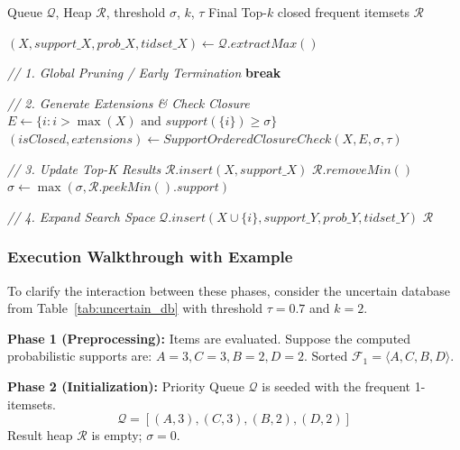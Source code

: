 \documentclass[10pt,letterpaper]{article}
\begin{document}
\begin{algorithm}[H]
\caption{Phase 3: Best-First Mining}
\label{alg:phase3}
\begin{algorithmic}[1]
\footnotesize
\REQUIRE Queue $\mathcal{Q}$, Heap $\mathcal{R}$, threshold $\sigma$, $k$, $\tau$
\ENSURE Final Top-$k$ closed frequent itemsets $\mathcal{R}$

    \STATE $(X, support\_X, prob\_X, tidset\_X) \leftarrow \mathcal{Q}.extractMax()$
    
    \STATE \textit{// 1. Global Pruning / Early Termination}
        \STATE \textbf{break} 
    \ENDIF
    
    \STATE \textit{// 2. Generate Extensions \& Check Closure}
    \STATE $E \leftarrow \{i : i > \max(X) \text{ and } support(\{i\}) \geq \sigma\}$
    \STATE $(isClosed, extensions) \leftarrow SupportOrderedClosureCheck(X, E, \sigma, \tau)$
    
    \STATE \textit{// 3. Update Top-K Results}
        \STATE $\mathcal{R}.insert(X, support\_X)$
         \STATE $\mathcal{R}.removeMin()$ \ENDIF
         \STATE $\sigma \leftarrow \max(\sigma, \mathcal{R}.peekMin().support)$ \ENDIF
    \ENDIF
    
    \STATE \textit{// 4. Expand Search Space}
            \STATE $\mathcal{Q}.insert(X \cup \{i\}, support\_Y, prob\_Y, tidset\_Y)$
        \ENDIF
    \ENDFOR
\ENDWHILE
\RETURN $\mathcal{R}$
\end{algorithmic}
\end{algorithm}

\subsubsection*{Execution Walkthrough with Example}
To clarify the interaction between these phases, consider the uncertain database from Table~\ref{tab:uncertain_db} with threshold $\tau=0.7$ and $k=2$.

\textbf{Phase 1 (Preprocessing):} 
Items are evaluated. Suppose the computed probabilistic supports are: $A=3, C=3, B=2, D=2$.
Sorted $\mathcal{F}_1 = \langle A, C, B, D \rangle$.

\textbf{Phase 2 (Initialization):} 
Priority Queue $\mathcal{Q}$ is seeded with the frequent 1-itemsets.
\begin{equation}
\mathcal{Q} = [ (A, 3), (C, 3), (B, 2), (D, 2) ]
\end{equation}
Result heap $\mathcal{R}$ is empty; $\sigma = 0$.
\end{document}
